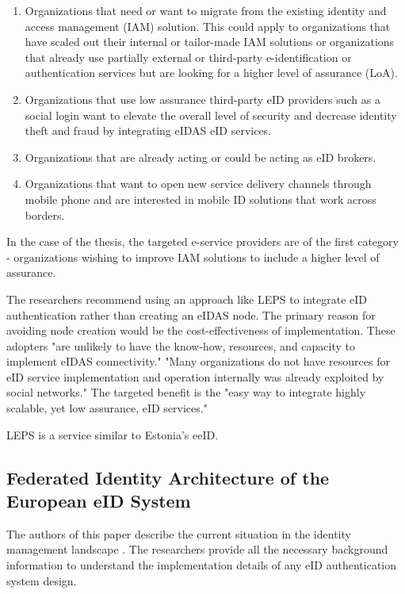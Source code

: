 \begin{enumerate}
    \item Organizations that need or want to migrate from the existing identity and access management (IAM) solution. This could apply to organizations that have scaled out their internal or tailor-made IAM solutions or organizations that already use partially external or third-party e-identification or authentication services but are looking for a higher level of assurance (LoA).
    \item Organizations that use low assurance third-party eID providers such as a social login want to elevate the overall level of security and decrease identity theft and fraud by integrating eIDAS eID services.
    \item Organizations that are already acting or could be acting as eID brokers.
    \item Organizations that want to open new service delivery channels through mobile phone and are interested in mobile ID solutions that work across borders.
\end{enumerate}

In the case of the thesis, the targeted e-service providers are of the first category - organizations wishing to improve IAM solutions to include a higher level of assurance.

The researchers recommend using an approach like LEPS to integrate eID authentication rather than creating an eIDAS node. The primary reason for avoiding node creation would be the cost-effectiveness of implementation. These adopters "are unlikely to have the know-how, resources, and capacity to implement eIDAS connectivity." "Many organizations do not have resources for eID service implementation and operation internally was already exploited by social networks." The targeted benefit is the "easy way to integrate highly scalable, yet low assurance, eID services."

LEPS is a service similar to Estonia's eeID.

\subsection{Federated Identity Architecture of the European eID System}

The authors of this paper describe the current situation in the identity management landscape \cite{federated-europe-identity}. The researchers provide all the necessary background information to understand the implementation details of any eID authentication system design.

